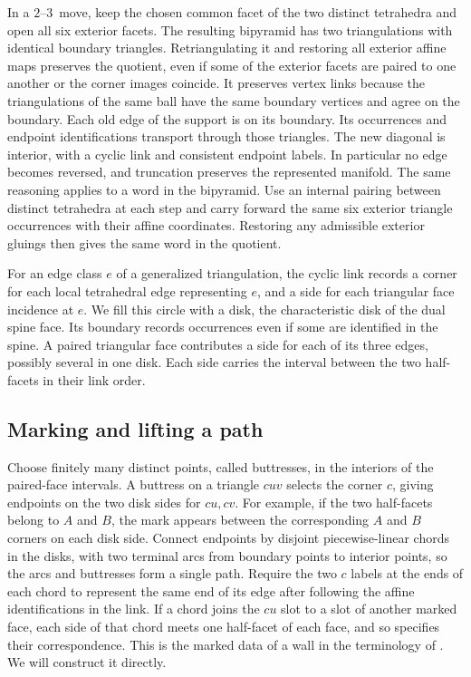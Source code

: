\documentclass[11pt]{amsart}
\newcommand{\moveup}{\(2\)--\(3\)}
\begin{document}
In a \moveup\ move, keep the chosen common facet of the two distinct
tetrahedra and open all six exterior facets. The resulting bipyramid has
two triangulations with identical boundary triangles. Retriangulating it
and restoring all exterior affine maps preserves the quotient, even if
some of the exterior facets are paired to one another or the corner
images coincide. It preserves vertex links because the triangulations
of the same ball have the same boundary vertices and agree on the
boundary. Each old edge of the support is on its boundary. Its occurrences
and endpoint identifications transport through those triangles. The new
diagonal is interior, with a cyclic link and consistent endpoint labels.
In particular no edge becomes reversed, and truncation preserves the
represented manifold. The same reasoning applies to a word in the
bipyramid. Use an internal pairing between distinct tetrahedra at each step and carry forward the same
six exterior triangle occurrences with their affine coordinates. Restoring
any admissible exterior gluings then gives the same word in the quotient.

For an edge class \(e\) of a generalized triangulation, the cyclic link
records a corner for each local tetrahedral edge representing \(e\), and
a side for each triangular face incidence at \(e\). We fill this circle
with a disk, the characteristic disk of the dual spine face. Its
boundary records occurrences even if some are identified in the spine.
A paired triangular face contributes a side for each of its three edges,
possibly several in one disk. Each side carries the interval between the
two half-facets in their link order.

\subsection{Marking and lifting a path}

Choose finitely many distinct points, called buttresses, in the interiors of
the paired-face intervals. A buttress on a triangle \(cuv\) selects the
corner \(c\), giving endpoints on the two disk sides for \(cu,cv\).
For example, if the two half-facets belong to \(A\) and \(B\), the mark
appears between the corresponding \(A\) and \(B\) corners on each disk
side. Connect endpoints by disjoint piecewise-linear chords in the disks,
with two terminal arcs from boundary points to interior points, so the
arcs and buttresses form a single path. Require the two \(c\) labels at
the ends of each chord to represent the same end of its edge after
following the affine identifications in the link. If a chord joins the
\(cu\) slot to a slot of another marked face, each side of that chord
meets one half-facet of each face, and so specifies their correspondence. This is the marked data of a
wall in the terminology of \cite[Section~3.1]{bh}. We will construct it directly.
\end{document}
